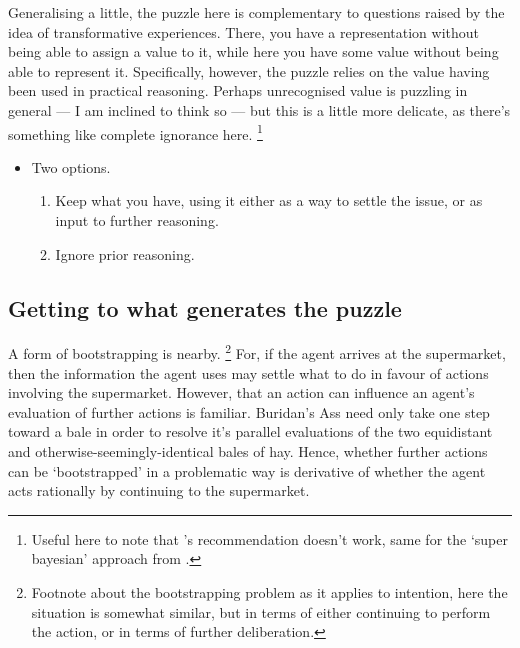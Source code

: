 \documentclass[10pt]{article}
\begin{document}
{\color{green} Generalising a little, the puzzle here is complementary to questions raised by the idea of transformative experiences.
  There, you have a representation without being able to assign a value to it, while here you have some value without being able to represent it.
  Specifically, however, the puzzle relies on the value having been used in practical reasoning.
  Perhaps unrecognised value is puzzling in general --- I am inclined to think so --- but this is a little more delicate, as there's something like complete ignorance here.}\nolinebreak
\footnote{
  Useful here to note that \citeauthor{Paul:2014aa}'s recommendation doesn't work, same for the `super bayesian' approach from \citeauthor{Pettigrew:2020aa}.
}


\begin{itemize}
\item Two options.
  \begin{enumerate}
  \item Keep what you have, using it either as a way to settle the issue, or as input to further reasoning.
  \item Ignore prior reasoning.
  \end{enumerate}
\end{itemize}



\subsection{Getting to what generates the puzzle}
\label{sec:gett-what-gener}

A form of bootstrapping is nearby.\nolinebreak
\footnote{Footnote about the bootstrapping problem as it applies to intention, here the situation is somewhat similar, but in terms of either continuing to perform the action, or in terms of further deliberation.}
For, if the agent arrives at the supermarket, then the information the agent uses may settle what to do in favour of actions involving the supermarket.
However, that an action can influence an agent's evaluation of further actions is familiar.
Buridan's Ass need only take one step toward a bale in order to resolve it's parallel evaluations of the two equidistant and otherwise-seemingly-identical bales of hay.
Hence, whether further actions can be `bootstrapped' in a problematic way is derivative of whether the agent acts rationally by continuing to the supermarket.
\end{document}
